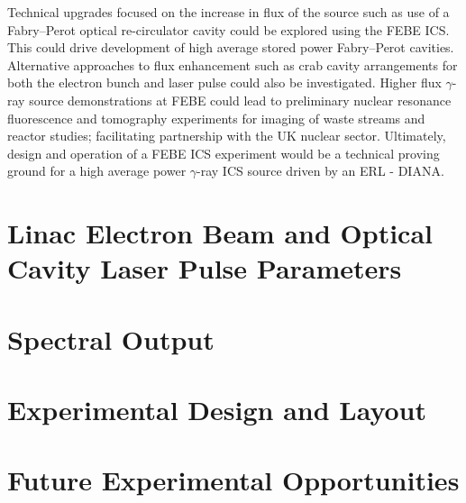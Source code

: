 \documentclass[../main.tex]{subfiles}
\begin{document}
Technical upgrades focused on the increase in flux of the source such as use of a Fabry--Perot optical re-circulator cavity could be explored using the FEBE ICS. This could drive development of high average stored power Fabry--Perot cavities. Alternative approaches to flux enhancement such as crab cavity arrangements for both the electron bunch \cite{variola2011luminosity,koshiba2018luminosity} and laser pulse could also be investigated. Higher flux $\gamma$-ray source demonstrations at FEBE could lead to preliminary nuclear resonance fluorescence and tomography experiments for imaging of waste streams and reactor studies; facilitating partnership with the UK nuclear sector. Ultimately, design and operation of a FEBE ICS experiment would be a technical proving ground for a high average power $\gamma$-ray ICS source driven by an ERL - DIANA.

\section{Linac Electron Beam and Optical Cavity Laser Pulse Parameters}

\section{Spectral Output}

\section{Experimental Design and Layout}

\section{Future Experimental Opportunities}
\end{document}
